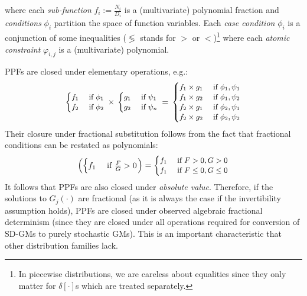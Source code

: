 \documentclass{article}
\newcommand{\bvec}[1]{\textbf{#1}}
\newcommand{\case}[2]{#2 &\text{ if } #1}%
\begin{document}
where each \emph{sub-function} $f_i := \frac{N_i}{D_i}$ is a (multivariate) polynomial fraction and
\emph{conditions} $\phi_i$ partition the space of function variables. 
Each \emph{case condition} $\phi_i$ is a conjunction of some inequalities ($\lessgtr$ stands for  
$>$ or $<$)\footnote{In piecewise distributions,  
we are careless about equalities since they only matter for $\delta[\cdot]$s which are treated separately.
} 
where each \emph{atomic constraint} $\varphi_{i,j}$ is a (multivariate) polynomial.


PPFs are closed under elementary operations, e.g.:
\begin{equation*}
\footnotesize
  \begin{cases}
  \case{\phi_1}{f_1}\\
  \case{\phi_2}{f_2}    
  \end{cases}
\,
 \times
\,
  \begin{cases}
  \case{\psi_1}{g_1} \\
  \case{\psi_n}{g_2} 
  \end{cases}
 \, = \,
\begin{cases}
  \case{\phi_1, \psi_1}{f_1 \times g_1} \\ 
  \case{\phi_1, \psi_2}{f_1 \times g_2} \\
  \case{\phi_2, \psi_1}{f_2 \times g_1} \\
  \case{\phi_2, \psi_2}{f_2 \times g_2}
  \end{cases}
\end{equation*} 
Their closure under fractional substitution follows from the fact that 
fractional conditions can be restated as polynomials:
\begin{align*}
\left(
 \begin{cases}
  \case{\frac{F}{G} > 0}{f_1} \\ 
 \end{cases} 
\right)
 =
{\footnotesize
\begin{cases}
  \case{F > 0, G > 0 }{f_1} \\ 
  \case{F \leq 0, G \leq 0}{f_1} \\ 
 \end{cases} 
}
\end{align*}
It follows that PPFs are also closed under \emph{absolute value}.
Therefore, if the solutions to $G_j(\cdot)$ are fractional (as it is always the case if the invertibility assumption holds),
PPFs are closed under  observed algebraic fractional determinism 
(since they are closed under  
all operations required for conversion of SD-GMs to purely stochastic GMs).
This is an important characteristic that other distribution families lack.  
\end{document}
